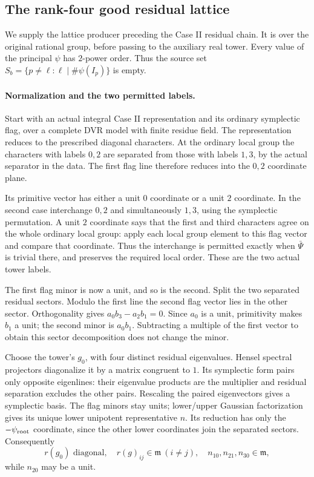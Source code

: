 \subsection{The rank-four good residual lattice}
\label{subsec:sr-four-good-residual-lattice}

We supply the lattice producer preceding the Case II residual
chain. It is over the original rational group, before passing
to the auxiliary real tower.
Every value of the principal \(\psi\) has \(2\)-power order.
Thus the source set
\(S_b=\{p\ne\ell:\ell\mid\#\psi(I_p)\}\) is empty.

\paragraph{Normalization and the two permitted labels.}
Start with an actual integral Case II representation and its
ordinary symplectic flag, over a complete DVR model with finite
residue field. The representation reduces to the prescribed
diagonal characters. At the ordinary local group the characters
with labels \(0,2\) are separated from those with labels \(1,3\),
by the actual separator in the data. The first flag line
therefore reduces into the \(0,2\) coordinate plane.

Its primitive vector has either a unit \(0\) coordinate or a
unit \(2\) coordinate. In the second case interchange \(0,2\)
and simultaneously \(1,3\), using the symplectic permutation.
A unit \(2\) coordinate says that the first and third
characters agree on the whole ordinary local group: apply
each local group element to this flag vector and compare
that coordinate. Thus the interchange is permitted exactly
when \(\bar\Psi\) is trivial there, and preserves the
required local order. These are the two actual tower labels.

The first flag minor is now a unit, and so is the second.
Split the two separated residual sectors. Modulo the first
line the second flag vector lies in the other sector.
Orthogonality gives \(a_0b_3-a_2b_1=0\).
Since \(a_0\) is a unit, primitivity makes \(b_1\) a unit;
the second minor is \(a_0b_1\).
Subtracting a multiple of the first vector to obtain this
sector decomposition does not change the minor.

Choose the tower's \(g_0\), with four distinct residual
eigenvalues. Hensel spectral projectors diagonalize it by
a matrix congruent to \(1\). Its symplectic form pairs only
opposite eigenlines: their eigenvalue products are the
multiplier and residual separation excludes the other pairs.
Rescaling the paired eigenvectors gives a symplectic basis.
The flag minors stay units; lower/upper Gaussian factorization
gives its unique lower unipotent representative \(n\).
Its reduction has only the \(-\psi_{\rm root}\) coordinate,
since the other lower coordinates join the separated sectors.
Consequently
\[
 r(g_0)\text{ diagonal},\quad
 r(g)_{ij}\in\mathfrak m\ (i\ne j),\quad
                 n_{10},n_{21},n_{30}\in\mathfrak m,       \tag{R4V1}
\]
while \(n_{20}\) may be a unit.

